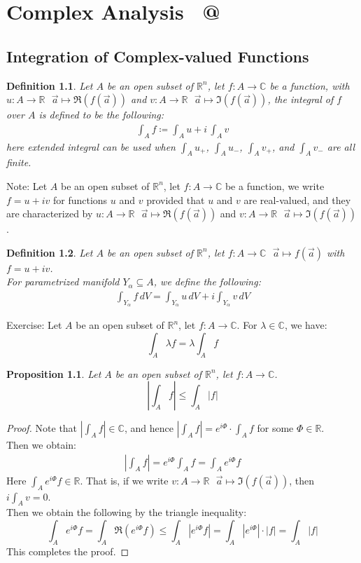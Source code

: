 \documentclass[15pt]{book}
\makeatletter
\theoremstyle{break}
\theoremstyle{break}
\newtheorem{prop}[lem]{Proposition}
\newtheorem{defn}{Definition}[corL]
\newcommand{\R}{\mathbb{R}}
\newcommand{\Complex}{\mathbb{C}}
\newcommand{\note}{\color{red}Note: \color{black}}
\newcommand{\exercise}{\color{green}Exercise: \color{black}}
\newcommand*{\rom}[1]{\expandafter\@slowromancap\romannumeral #1@}
\makeatother
\begin{document}
\newpage
\chapter{Complex Analysis \ \rom{1}}
\setcounter{section}{20}
\section[Integration of Complex-valued Functions]{\color{red}Integration of Complex-valued Functions\color{black}}
\begin{defn}
Let $A$ be an open subset of $\R^n$, let $f:A \to \Complex$ be a function, with $u:A \to \R\ \ \ \vec{a}\mapsto \Re(f(\vec{a}))$ and  $v:A\to \R \ \ \ \vec{a}\mapsto \Im(f(\vec{a}))$, the integral of $f$ over $A$ is defined to be the following:
\begin{align*}
\int_A f \coloneqq \int_A u + i\, \int_A v
\end{align*}
here extended integral can be used when $\int_A u_+$, $\int_A u_-$, $\int_A v_+$, and $\int_A v_-$ are all finite. 
\end{defn}

\note Let $A$ be an open subset of $\R^n$, let $f:A \to \Complex$ be a function, we write $f = u + iv$ for functions $u$ and $v$ provided that $u$ and $v$ are real-valued, and they are characterized by $u:A \to \R\ \ \ \vec{a}\mapsto \Re(f(\vec{a}))$ and  $v:A\to \R \ \ \ \vec{a}\mapsto \Im(f(\vec{a}))$. 

\begin{defn}
Let $A$ be an open subset of $\R^n$, let $f:A \to \Complex  \ \ \ \vec{a}\mapsto f(\vec{a})$ with $f = u+iv$. \\
For parametrized manifold $Y_\alpha \subseteq A$, we define the following:
\begin{align*}
\int_{Y_\alpha} f\, dV = \int_{Y_\alpha}u \, dV + i \int_{Y_\alpha} v \, dV
\end{align*}
\end{defn}

\exercise Let $A$ be an open subset of $\R^n$, let $f:A \to \Complex$. For $\lambda \in \Complex$, we have: $$\int_A \lambda f = \lambda \int_A f$$


\begin{prop}
Let $A$ be an open subset of $\R^n$, let $f:A \to \Complex$.
$$\left|\int_A f\right| \leq \int_A |f|$$
\end{prop}
\begin{proof}
Note that $|\int_A f|\in \Complex$, and hence $|\int_A f| = e^{i\Phi} \cdot \int_A f$ for some $\Phi \in \R$. \\Then we obtain:
\begin{align*}
\left| \int_A f\right| = e^{i\Phi} \int_A f = \int_A e^{i\Phi} f
\end{align*}
Here $\int_A e^{i\Phi} f \in \R$. That is, if we write $v:A \to \R \ \ \ \vec{a}\mapsto \Im(f(\vec{a}))$, then $i \int_A v = 0$. \\Then we obtain the following by the triangle inequality:
$$\int_A e^{i\Phi} f = \int_A \Re(e^{i\Phi} f) \leq \int_A |e^{i\Phi} f| = \int_A |e^{i\Phi}| \cdot |f| = \int_A |f|$$
This completes the proof.
\end{proof}
\end{document}
